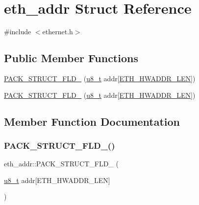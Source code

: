 \hypertarget{structeth__addr}{}\section{eth\+\_\+addr Struct Reference}
\label{structeth__addr}


{\ttfamily \#include $<$ethernet.\+h$>$}

\subsection*{Public Member Functions}
\begin{DoxyCompactItemize}
\item 
\hyperlink{structeth__addr_acafa3550b2f9a0b45c11b17b280fb8cb}{P\+A\+C\+K\+\_\+\+S\+T\+R\+U\+C\+T\+\_\+\+F\+L\+D\+\_} (\hyperlink{group__compiler__abstraction_ga4caecabca98b43919dd11be1c0d4cd8e}{u8\+\_\+t} addr\mbox{[}\hyperlink{openmote-cc2538_2lwip_2src_2include_2lwip_2prot_2ethernet_8h_ac9426049770b40fcd9556ffbd7e56907}{E\+T\+H\+\_\+\+H\+W\+A\+D\+D\+R\+\_\+\+L\+EN}\mbox{]})
\item 
\hyperlink{structeth__addr_acafa3550b2f9a0b45c11b17b280fb8cb}{P\+A\+C\+K\+\_\+\+S\+T\+R\+U\+C\+T\+\_\+\+F\+L\+D\+\_} (\hyperlink{group__compiler__abstraction_ga4caecabca98b43919dd11be1c0d4cd8e}{u8\+\_\+t} addr\mbox{[}\hyperlink{openmote-cc2538_2lwip_2src_2include_2lwip_2prot_2ethernet_8h_ac9426049770b40fcd9556ffbd7e56907}{E\+T\+H\+\_\+\+H\+W\+A\+D\+D\+R\+\_\+\+L\+EN}\mbox{]})
\end{DoxyCompactItemize}


\subsection{Member Function Documentation}
\mbox{\label{structeth__addr_acafa3550b2f9a0b45c11b17b280fb8cb}} 
\subsubsection{\texorpdfstring{P\+A\+C\+K\+\_\+\+S\+T\+R\+U\+C\+T\+\_\+\+F\+L\+D\+\_()}{PACK\_STRUCT\_FLD\_8()}\hspace{0.1cm}{\footnotesize\ttfamily [1/2]}}
{\footnotesize\ttfamily eth\+\_\+addr\+::\+P\+A\+C\+K\+\_\+\+S\+T\+R\+U\+C\+T\+\_\+\+F\+L\+D\+\_ (\begin{DoxyParamCaption}\item[{\hyperlink{group__compiler__abstraction_ga4caecabca98b43919dd11be1c0d4cd8e}{u8\+\_\+t}}]{addr\mbox{[}\+E\+T\+H\+\_\+\+H\+W\+A\+D\+D\+R\+\_\+\+L\+E\+N\mbox{]} }\end{DoxyParamCaption})}

